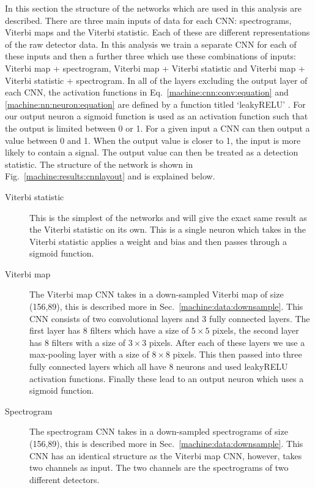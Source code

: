 In this section the structure of the networks which are used in this analysis
are described. There are three main inputs of data for each \ac{CNN}: spectrograms, Viterbi maps and the Viterbi statistic. Each of these are different representations of the raw detector data. In this analysis we train a separate \ac{CNN} for each of
these inputs and then a further three which use these combinations of inputs:
Viterbi map + spectrogram, Viterbi map + Viterbi statistic and Viterbi map +
Viterbi statistic + spectrogram. In all of the layers excluding the output layer of each \ac{CNN}, the activation functions in Eq.~\ref{machine:cnn:conv:equation} and \ref{machine:nn:neuron:equation} are defined by a function titled `leakyRELU' \cite{maas2013RectifierNonlinearities}. 
For our output neuron a sigmoid function is
used as an activation function such that the output is limited between 0 or 1.
For a given input a \ac{CNN} can then output a value between 0 and 1. When the output value is closer to 1, the input is more likely to contain a signal. 
The output value can then be treated as a detection statistic. 
The structure of the network is shown in Fig.~\ref{machine:results:cnnlayout} and is explained below. 

\begin{description}
	\item [Viterbi statistic] This is the simplest of the networks and will
	give the exact same result as the Viterbi statistic on its own. This is a
	single neuron which takes in the Viterbi statistic applies a weight and bias
	and then passes through a sigmoid function.
	
	\item [Viterbi map] The Viterbi map \ac{CNN} takes in a down-sampled Viterbi map of size (156,89), this is described more in Sec.~\ref{machine:data:downsample}.
	This \ac{CNN} consists of two convolutional layers and 3 fully connected layers. The first layer has
	8 filters which have a size of $5\times5$ pixels, the second layer has 8
	filters with a size of $3\times3$ pixels. After each of these layers we use a
	max-pooling layer with a size of $8\times8$ pixels. This then passed into three
	fully connected layers which all have 8 neurons and used leakyRELU activation
	functions. Finally these lead to an output neuron which uses a sigmoid
	function.
	
	\item [Spectrogram] The spectrogram \ac{CNN} takes in a down-sampled spectrograms of size (156,89), this is described more in Sec.~\ref{machine:data:downsample}.
	This \ac{CNN} has an identical structure as the Viterbi map \ac{CNN}, however, takes two channels as input. The two channels are the spectrograms of two different detectors.
	
\end{description}

